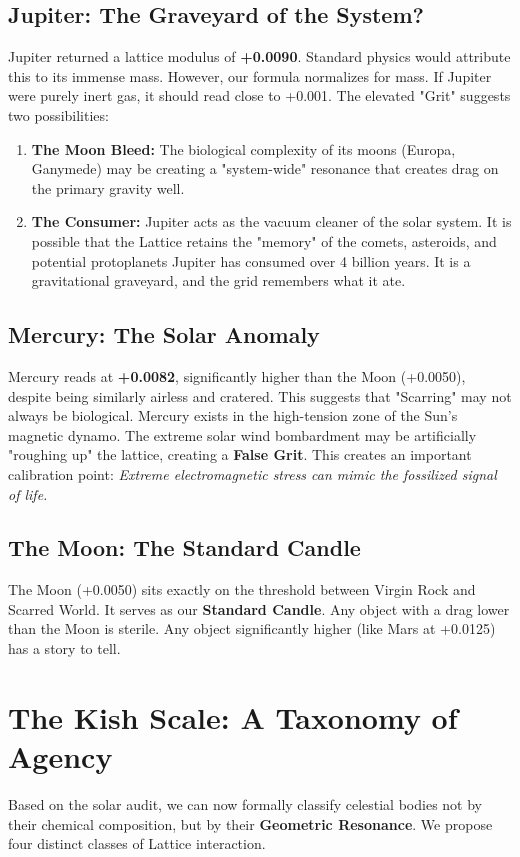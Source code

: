 \documentclass[11pt, letterpaper, openany]{book}
\begin{document}
\subsection{Jupiter: The Graveyard of the System?}
Jupiter returned a lattice modulus of \textbf{+0.0090}.
Standard physics would attribute this to its immense mass. However, our formula normalizes for mass. If Jupiter were purely inert gas, it should read close to +0.001.
The elevated "Grit" suggests two possibilities:
\begin{enumerate}
    \item \textbf{The Moon Bleed:} The biological complexity of its moons (Europa, Ganymede) may be creating a "system-wide" resonance that creates drag on the primary gravity well.
    \item \textbf{The Consumer:} Jupiter acts as the vacuum cleaner of the solar system. It is possible that the Lattice retains the "memory" of the comets, asteroids, and potential protoplanets Jupiter has consumed over 4 billion years. It is a gravitational graveyard, and the grid remembers what it ate.
\end{enumerate}

\subsection{Mercury: The Solar Anomaly}
Mercury reads at \textbf{+0.0082}, significantly higher than the Moon (+0.0050), despite being similarly airless and cratered.
This suggests that "Scarring" may not always be biological. Mercury exists in the high-tension zone of the Sun's magnetic dynamo. The extreme solar wind bombardment may be artificially "roughing up" the lattice, creating a \textbf{False Grit}. This creates an important calibration point: \textit{Extreme electromagnetic stress can mimic the fossilized signal of life.}

\subsection{The Moon: The Standard Candle}
The Moon (+0.0050) sits exactly on the threshold between Virgin Rock and Scarred World. It serves as our \textbf{Standard Candle}. Any object with a drag lower than the Moon is sterile. Any object significantly higher (like Mars at +0.0125) has a story to tell.

\section{The Kish Scale: A Taxonomy of Agency}
Based on the solar audit, we can now formally classify celestial bodies not by their chemical composition, but by their \textbf{Geometric Resonance}. We propose four distinct classes of Lattice interaction.
\end{document}
